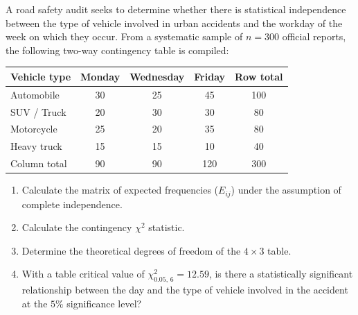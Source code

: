 \begin{problema}
	\label{prob:d6f0154}
	A road safety audit seeks to determine whether there is statistical independence between the type of vehicle involved in urban accidents and the workday of the week on which they occur. From a systematic sample of $n = 300$ official reports, the following two-way contingency table is compiled:
	\begin{center}
		\begin{tabular}{|l|c|c|c|c|}\hline
			Vehicle type & Monday & Wednesday & Friday & Row total \\\hline
			Automobile & 30 & 25 & 45 & 100 \\\hline
			SUV / Truck & 20 & 30 & 30 & 80 \\\hline
			Motorcycle & 25 & 20 & 35 & 80 \\\hline
			Heavy truck & 15 & 15 & 10 & 40 \\\hline
			Column total & 90 & 90 & 120 & 300 \\\hline
		\end{tabular}
	\end{center}
	\begin{enumerate}
		\item Calculate the matrix of expected frequencies ($E_{ij}$) under the assumption of complete independence.
		\item Calculate the contingency $\chi^2$ statistic.
		\item Determine the theoretical degrees of freedom of the $4 \times 3$ table.
		\item With a table critical value of $\chi^2_{0.05, \, 6} = 12.59$, is there a statistically significant relationship between the day and the type of vehicle involved in the accident at the $5\%$ significance level?
	\end{enumerate}
\end{problema}


